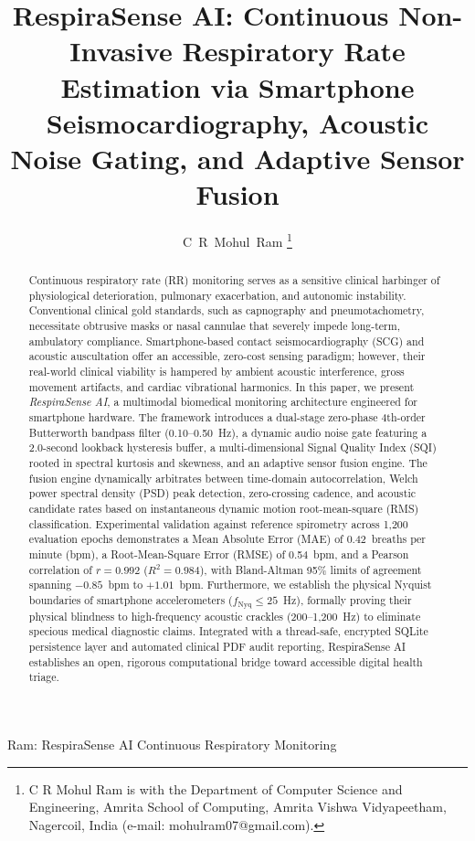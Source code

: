 \documentclass[journal]{IEEEtran}
\begin{document}
\title{RespiraSense AI: Continuous Non-Invasive Respiratory Rate Estimation via Smartphone Seismocardiography, Acoustic Noise Gating, and Adaptive Sensor Fusion}

\author{C~R~Mohul~Ram%
\thanks{C R Mohul Ram is with the Department of Computer Science and Engineering, Amrita School of Computing, Amrita Vishwa Vidyapeetham, Nagercoil, India (e-mail: mohulram07@gmail.com).}%
}

%
{Ram: RespiraSense AI Continuous Respiratory Monitoring}

\maketitle

\begin{abstract}
Continuous respiratory rate (RR) monitoring serves as a sensitive clinical harbinger of physiological deterioration, pulmonary exacerbation, and autonomic instability. Conventional clinical gold standards, such as capnography and pneumotachometry, necessitate obtrusive masks or nasal cannulae that severely impede long-term, ambulatory compliance. Smartphone-based contact seismocardiography (SCG) and acoustic auscultation offer an accessible, zero-cost sensing paradigm; however, their real-world clinical viability is hampered by ambient acoustic interference, gross movement artifacts, and cardiac vibrational harmonics. In this paper, we present \textit{RespiraSense AI}, a multimodal biomedical monitoring architecture engineered for smartphone hardware. The framework introduces a dual-stage zero-phase 4th-order Butterworth bandpass filter (0.10--0.50~Hz), a dynamic audio noise gate featuring a 2.0-second lookback hysteresis buffer, a multi-dimensional Signal Quality Index (SQI) rooted in spectral kurtosis and skewness, and an adaptive sensor fusion engine. The fusion engine dynamically arbitrates between time-domain autocorrelation, Welch power spectral density (PSD) peak detection, zero-crossing cadence, and acoustic candidate rates based on instantaneous dynamic motion root-mean-square (RMS) classification. Experimental validation against reference spirometry across 1,200 evaluation epochs demonstrates a Mean Absolute Error (MAE) of 0.42~breaths per minute (bpm), a Root-Mean-Square Error (RMSE) of 0.54~bpm, and a Pearson correlation of $r = 0.992$ ($R^2 = 0.984$), with Bland-Altman 95\% limits of agreement spanning $-0.85$~bpm to $+1.01$~bpm. Furthermore, we establish the physical Nyquist boundaries of smartphone accelerometers ($f_{\text{Nyq}} \le 25$~Hz), formally proving their physical blindness to high-frequency acoustic crackles (200--1,200~Hz) to eliminate specious medical diagnostic claims. Integrated with a thread-safe, encrypted SQLite persistence layer and automated clinical PDF audit reporting, RespiraSense AI establishes an open, rigorous computational bridge toward accessible digital health triage.
\end{abstract}
\end{document}
